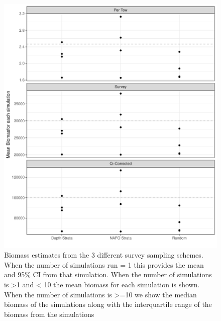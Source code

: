 \documentclass[
]{article}
\begin{document}
\begin{figure}
\centering
\includegraphics{Survey_tutortial_files/figure-latex/bm-plts-1.pdf}
\caption{\label{fig:bm-plts}Biomass estimates from the 3 different survey sampling schemes. When the number of simulations run = 1 this provides the mean and 95\% CI from that simulation. When the number of simulations is \textgreater1 and \textless{} 10 the mean biomass for each simulation is shown. When the number of simulations is \textgreater=10 we show the median biomass of the simulations along with the interquartile range of the biomass from the simulations}
\end{figure}
\end{document}
